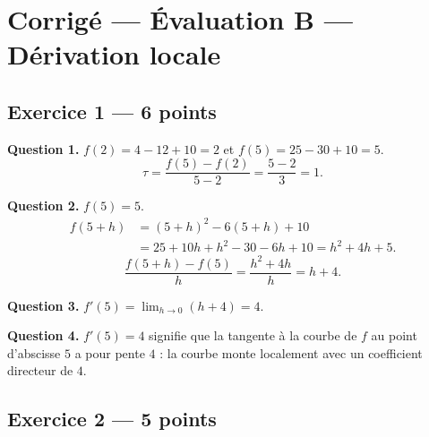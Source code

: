 
\section*{Corrigé — Évaluation B — Dérivation locale}

\subsection*{Exercice 1 — 6 points}


\textbf{Question 1.}
$f(2) = 4 - 12 + 10 = 2$ et $f(5) = 25 - 30 + 10 = 5$.
\[
\tau = \frac{f(5)-f(2)}{5-2} = \frac{5-2}{3} = 1.
\]

\textbf{Question 2.}
$f(5) = 5$.
\begin{align*}
f(5+h) &= (5+h)^2 - 6(5+h) + 10 \\
        &= 25 + 10h + h^2 - 30 - 6h + 10 = h^2 + 4h + 5.
\end{align*}
\[
\frac{f(5+h)-f(5)}{h} = \frac{h^2+4h}{h} = h+4.
\]

\textbf{Question 3.}
$f'(5) = \lim_{h \to 0}(h+4) = 4.$

\textbf{Question 4.}
$f'(5) = 4$ signifie que la tangente à la courbe de $f$ au point d'abscisse $5$ a pour pente $4$ : la courbe monte localement avec un coefficient directeur de $4$.

\subsection*{Exercice 2 — 5 points}


